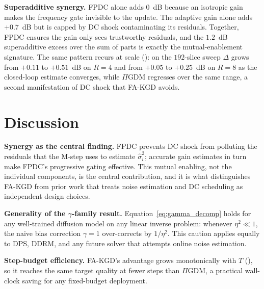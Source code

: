 \documentclass[conference]{IEEEtran}
\newcommand{\hatsig}{\hat{\sigma}}
\newcommand{\PIGDM}{$\Pi$GDM}
\begin{document}
\textbf{Superadditive synergy.} FPDC alone adds $0$~dB because an isotropic
gain makes the frequency gate invisible to the update. The adaptive gain
alone adds $+0.7$~dB but is capped by DC shock contaminating its residuals.
Together, FPDC ensures the gain only sees trustworthy residuals, and the
$1.2$~dB superadditive excess over the sum of parts is exactly the
mutual-enablement signature. The same pattern recurs at scale
(): on the $192$-slice sweep $\Delta$ grows from
$+0.11$ to $+0.51$~dB on $R{=}4$ and from $+0.05$ to $+0.25$~dB on
$R{=}8$ as the closed-loop estimate converges, while \PIGDM{} regresses
over the same range, a second manifestation of DC shock that FA-KGD
avoids.

\section{Discussion}
\label{sec:discussion}

\textbf{Synergy as the central finding.} FPDC prevents DC shock from
polluting the residuals that the M-step uses to estimate $\hatsig_i^2$;
accurate gain estimates in turn make FPDC's progressive gating effective.
This mutual enabling, not the individual components, is the central
contribution, and it is what distinguishes FA-KGD from prior work that treats
noise estimation and DC scheduling as independent design choices.

\textbf{Generality of the $\gamma$-family result.}
Equation~\eqref{eq:gamma_decomp} holds for any well-trained diffusion
model on any linear inverse problem: whenever $\eta^2\!\ll\!1$, the naive
bias correction $\gamma{=}1$ over-corrects by $1/\eta^2$. This caution
applies equally to DPS, DDRM, and any future solver that attempts online
noise estimation.

\textbf{Step-budget efficiency.} FA-KGD's advantage grows monotonically
with $T$ (), so it reaches the same target quality at
fewer steps than $\Pi$GDM, a practical wall-clock saving for any
fixed-budget deployment.
\end{document}
